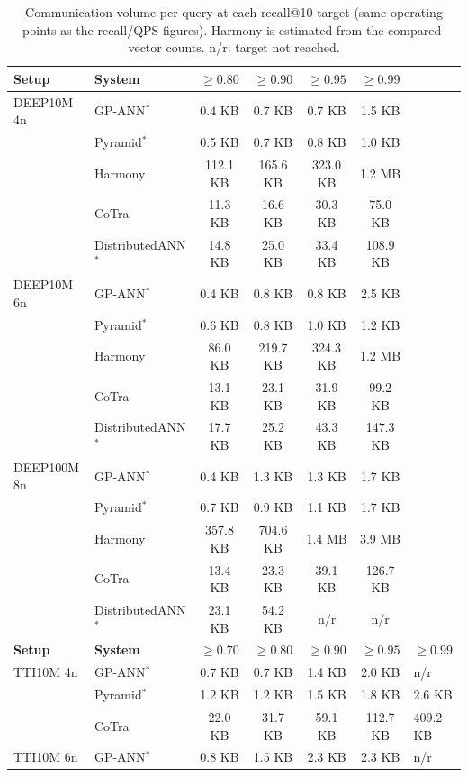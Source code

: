\begin{table}[t]
\centering
\small
\caption{Communication volume per query at each recall@10 target (same operating points as the recall/QPS figures). Harmony is estimated from the compared-vector counts. n/r: target not reached.}
\label{tab:comm-cost}
\begin{tabular}{llcccc}
\toprule
\textbf{Setup} & \textbf{System} & $\geq 0.80$ & $\geq 0.90$ & $\geq 0.95$ & $\geq 0.99$ \\
\midrule
DEEP10M 4n & GP-ANN$^*$ & 0.4 KB & 0.7 KB & 0.7 KB & 1.5 KB \\
 & Pyramid$^*$ & 0.5 KB & 0.7 KB & 0.8 KB & 1.0 KB \\
 & Harmony & 112.1 KB & 165.6 KB & 323.0 KB & 1.2 MB \\
 & CoTra & 11.3 KB & 16.6 KB & 30.3 KB & 75.0 KB \\
 & DistributedANN$^*$ & 14.8 KB & 25.0 KB & 33.4 KB & 108.9 KB \\
\addlinespace
DEEP10M 6n & GP-ANN$^*$ & 0.4 KB & 0.8 KB & 0.8 KB & 2.5 KB \\
 & Pyramid$^*$ & 0.6 KB & 0.8 KB & 1.0 KB & 1.2 KB \\
 & Harmony & 86.0 KB & 219.7 KB & 324.3 KB & 1.2 MB \\
 & CoTra & 13.1 KB & 23.1 KB & 31.9 KB & 99.2 KB \\
 & DistributedANN$^*$ & 17.7 KB & 25.2 KB & 43.3 KB & 147.3 KB \\
\addlinespace
DEEP100M 8n & GP-ANN$^*$ & 0.4 KB & 1.3 KB & 1.3 KB & 1.7 KB \\
 & Pyramid$^*$ & 0.7 KB & 0.9 KB & 1.1 KB & 1.7 KB \\
 & Harmony & 357.8 KB & 704.6 KB & 1.4 MB & 3.9 MB \\
 & CoTra & 13.4 KB & 23.3 KB & 39.1 KB & 126.7 KB \\
 & DistributedANN$^*$ & 23.1 KB & 54.2 KB & n/r & n/r \\
\midrule
\textbf{Setup} & \textbf{System} & $\geq 0.70$ & $\geq 0.80$ & $\geq 0.90$ & $\geq 0.95$ & $\geq 0.99$ \\
\midrule
TTI10M 4n & GP-ANN$^*$ & 0.7 KB & 0.7 KB & 1.4 KB & 2.0 KB & n/r \\
 & Pyramid$^*$ & 1.2 KB & 1.2 KB & 1.5 KB & 1.8 KB & 2.6 KB \\
 & CoTra & 22.0 KB & 31.7 KB & 59.1 KB & 112.7 KB & 409.2 KB \\
\addlinespace
TTI10M 6n & GP-ANN$^*$ & 0.8 KB & 1.5 KB & 2.3 KB & 2.3 KB & n/r \\

\end{tabular}
\end{table}

